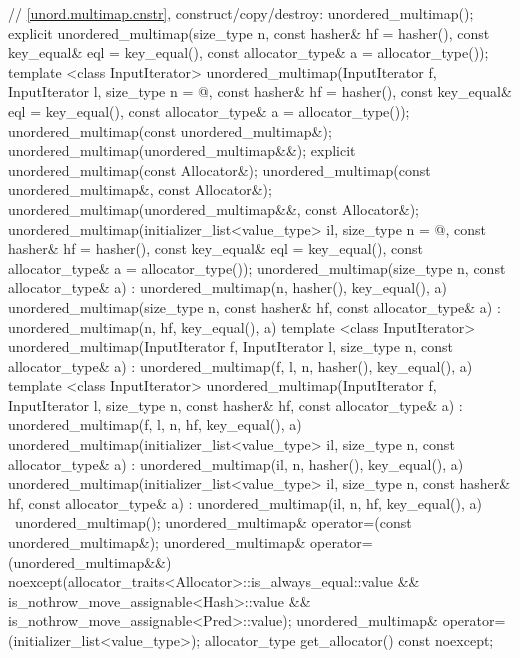 \begin{codeblock}
{{    // \ref{unord.multimap.cnstr}, construct/copy/destroy:
    unordered_multimap();
    explicit unordered_multimap(size_type n,
                                const hasher& hf = hasher(),
                                const key_equal& eql = key_equal(),
                                const allocator_type& a = allocator_type());
    template <class InputIterator>
      unordered_multimap(InputIterator f, InputIterator l,
                         size_type n = @\seebelow@,
                         const hasher& hf = hasher(),
                         const key_equal& eql = key_equal(),
                         const allocator_type& a = allocator_type());
    unordered_multimap(const unordered_multimap&);
    unordered_multimap(unordered_multimap&&);
    explicit unordered_multimap(const Allocator&);
    unordered_multimap(const unordered_multimap&, const Allocator&);
    unordered_multimap(unordered_multimap&&, const Allocator&);
    unordered_multimap(initializer_list<value_type> il,
                       size_type n = @\seebelow@,
                       const hasher& hf = hasher(),
                       const key_equal& eql = key_equal(),
                       const allocator_type& a = allocator_type());
    unordered_multimap(size_type n, const allocator_type& a)
      : unordered_multimap(n, hasher(), key_equal(), a) { }
    unordered_multimap(size_type n, const hasher& hf, const allocator_type& a)
      : unordered_multimap(n, hf, key_equal(), a) { }
    template <class InputIterator>
      unordered_multimap(InputIterator f, InputIterator l, size_type n, const allocator_type& a)
        : unordered_multimap(f, l, n, hasher(), key_equal(), a) { }
    template <class InputIterator>
      unordered_multimap(InputIterator f, InputIterator l, size_type n, const hasher& hf, 
                         const allocator_type& a)
        : unordered_multimap(f, l, n, hf, key_equal(), a) { }
    unordered_multimap(initializer_list<value_type> il, size_type n, const allocator_type& a)
      : unordered_multimap(il, n, hasher(), key_equal(), a) { }
    unordered_multimap(initializer_list<value_type> il, size_type n, const hasher& hf, 
                       const allocator_type& a)
      : unordered_multimap(il, n, hf, key_equal(), a) { }
    ~unordered_multimap();
    unordered_multimap& operator=(const unordered_multimap&);
    unordered_multimap& operator=(unordered_multimap&&)
      noexcept(allocator_traits<Allocator>::is_always_equal::value &&
               is_nothrow_move_assignable<Hash>::value &&
               is_nothrow_move_assignable<Pred>::value);
    unordered_multimap& operator=(initializer_list<value_type>);
    allocator_type get_allocator() const noexcept;

}}
\end{codeblock}
